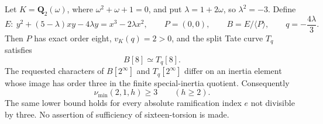 \begin{proposition}[B-RD43: even eight-torsion does not suffice at $p=2,e=1$]
\label{prop:B-RD43}
Let $K=\mathbf Q_2(\omega)$, where $\omega^2+\omega+1=0$, and put
$\lambda=1+2\omega$, so $\lambda^2=-3$. Define
\[
 E:\ y^2+(5-\lambda)xy-4\lambda y=x^3-2\lambda x^2,
 \qquad P=(0,0),\qquad B=E/\langle P\rangle,
 \qquad q=-\frac{4\lambda}{3}.
                                                        \tag{B-RD43.1}
\]
Then $P$ has exact order eight, $v_K(q)=2>0$, and the split Tate
curve $T_q$ satisfies
\[
                             B[8]\simeq T_q[8].
                                                        \tag{B-RD43.2}
\]
The requested characters of $B[2^\infty]$ and $T_q[2^\infty]$
differ on an inertia element whose image has order three in the
finite special-inertia quotient. Consequently
\[
                       \nu_{\min}(2,1,h)\ge3\qquad(h\ge2).
                                                        \tag{B-RD43.3}
\]
The same lower bound holds for every absolute ramification index
$e$ not divisible by three. No assertion of sufficiency of
sixteen-torsion is made.
\end{proposition}
